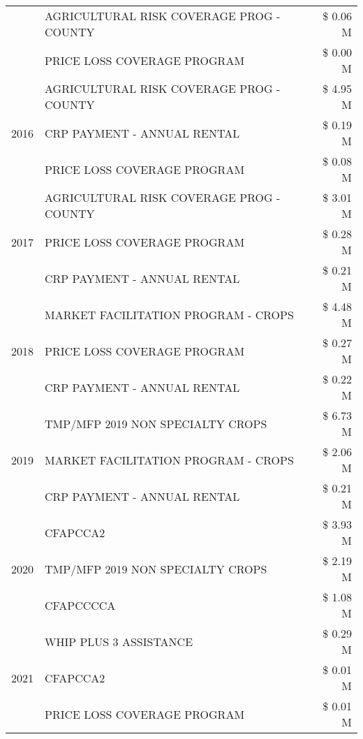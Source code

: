 \begin{tabular}{llr}
 & AGRICULTURAL RISK COVERAGE PROG - COUNTY & \$ 0.06 M \\
 & PRICE LOSS COVERAGE PROGRAM & \$ 0.00 M \\
\cline{1-3}
\multirow[t]{3}{*}{2016} & AGRICULTURAL RISK COVERAGE PROG - COUNTY      & \$ 4.95 M \\
 & CRP PAYMENT - ANNUAL RENTAL                   & \$ 0.19 M \\
 & PRICE LOSS COVERAGE PROGRAM                   & \$ 0.08 M \\
\cline{1-3}
\multirow[t]{3}{*}{2017} & AGRICULTURAL RISK COVERAGE PROG - COUNTY & \$ 3.01 M \\
 & PRICE LOSS COVERAGE PROGRAM & \$ 0.28 M \\
 & CRP PAYMENT - ANNUAL RENTAL & \$ 0.21 M \\
\cline{1-3}
\multirow[t]{3}{*}{2018} & MARKET FACILITATION PROGRAM - CROPS & \$ 4.48 M \\
 & PRICE LOSS COVERAGE PROGRAM & \$ 0.27 M \\
 & CRP PAYMENT - ANNUAL RENTAL & \$ 0.22 M \\
\cline{1-3}
\multirow[t]{3}{*}{2019} & TMP/MFP 2019 NON SPECIALTY CROPS & \$ 6.73 M \\
 & MARKET FACILITATION PROGRAM - CROPS & \$ 2.06 M \\
 & CRP PAYMENT - ANNUAL RENTAL & \$ 0.21 M \\
\cline{1-3}
\multirow[t]{3}{*}{2020} & CFAPCCA2 & \$ 3.93 M \\
 & TMP/MFP 2019 NON SPECIALTY CROPS & \$ 2.19 M \\
 & CFAPCCCCA & \$ 1.08 M \\
\cline{1-3}
\multirow[t]{3}{*}{2021} & WHIP PLUS 3 ASSISTANCE & \$ 0.29 M \\
 & CFAPCCA2 & \$ 0.01 M \\
 & PRICE LOSS COVERAGE PROGRAM & \$ 0.01 M \\
\cline{1-3}
\bottomrule
\end{tabular}
